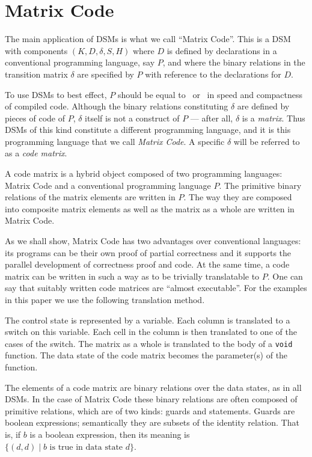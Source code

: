 \documentclass[preprint,11pt]{elsarticle}
\begin{document}
\vfill\eject
\section{Matrix Code}
\label{sec:MC}
The main application of DSMs is what we call ``Matrix Code''.
This is a DSM with components $(K,D,\delta,S,H)$ where $D$
is defined by declarations in a conventional programming language,
say $P$, and where the binary relations in the transition matrix
$\delta$ are specified by $P$ with reference to the declarations
for $D$.

To use DSMs to best effect, $P$ should be
equal to \ccc\ or \cpp\
in speed and compactness of compiled code.
Although the binary relations constituting $\delta$
are defined by pieces of code of $P$,
$\delta$ itself is not a construct of $P$ ---
after all, $\delta$ is a \emph{matrix}.
Thus DSMs of this kind constitute a different programming language,
and it is this programming language that we call
\emph{Matrix Code}.
A specific $\delta$ will be referred to as a \emph{code matrix}.

A code matrix is a hybrid object
composed of two programming languages:
Matrix Code and a conventional programming language $P$.
The primitive binary relations of the matrix elements
are written in $P$.
The way they are composed into composite matrix elements
as well as the matrix as a whole are written in Matrix Code.

As we shall show, Matrix Code has two advantages over conventional
languages:
its programs can be their own proof of partial correctness
and it supports
the parallel development of correctness proof and code.
At the same time, a code matrix can be written in such a way as to be
trivially translatable to $P$.
One can say that suitably written code matrices
are ``almost executable''.
For the examples in this paper
we use the following translation method.

The control state is represented by a variable.
Each column is translated to a switch on this variable.
Each cell in the column is then translated
to one of the cases of the switch.
The matrix as a whole is translated
to the body of a {\tt void} function.
The data state of the code matrix becomes
the parameter(s) of the function.

The elements of a code matrix are binary relations
over the data states, as in all DSMs.
In the case of Matrix Code these binary relations are often
composed of primitive relations, which are of two kinds:
guards and statements.
Guards are boolean expressions;
semantically they are subsets of the identity relation.
That is, if $b$ is a boolean expression,
then its meaning is
$\{(d,d) \mid b \mbox{ is true in data state } d\}$.
\end{document}
